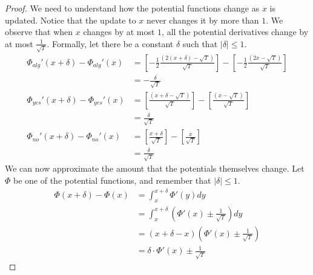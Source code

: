 \documentclass[final,12pt]{colt2018}
\newcommand{\Potential}{\Phi}
\newcommand{\PotentialAlg}{\Potential_{alg}}
\newcommand{\PotentialYes}{\Potential_{yes}}
\newcommand{\PotentialNo}{\Potential_{no}}
\begin{document}
\begin{proof}
  We need to understand how the potential functions change as $x$ is updated.
  Notice that the update to $x$ never changes it by more than $1$. We observe
  that when $x$ changes by at most $1$, all the potential derivatives change by
  at most $\frac{1}{\sqrt{T}}$. Formally, let there be a constant $\delta$ such
  that $|\delta| \le 1$.
  \begin{align*}
    \PotentialAlg'(x + \delta) - \PotentialAlg'(x)
      &= \left[ -\frac12 \frac{(2(x + \delta) - \sqrt{T})}{\sqrt{T}} \right]
      - \left[ -\frac12 \frac{(2x - \sqrt{T})}{\sqrt{T}} \right] \\
      &= -\frac{\delta}{\sqrt{T}} \\
    \PotentialYes'(x + \delta) - \PotentialYes'(x)
      &= \left[ \frac{(x + \delta - \sqrt{T})}{\sqrt{T}} \right]
      - \left[ \frac{(x - \sqrt{T})}{\sqrt{T}} \right] \\
      &= \frac{\delta}{\sqrt{T}} \\
    \PotentialNo'(x + \delta) - \PotentialNo'(x)
      &= \left[ \frac{x + \delta}{\sqrt{T}} \right]
      - \left[ \frac{x}{\sqrt{T}} \right] \\
      &= \frac{\delta}{\sqrt{T}}
  \end{align*}
  We can now approximate the amount that the potentials themselves change. Let
  $\Potential$ be one of the potential functions, and remember that
  $|\delta| \le 1$.
  \begin{align*}
    \Potential(x + \delta) - \Potential(x)
      &= \int_x^{x + \delta} \Potential'(y) dy \\
      &= \int_x^{x + \delta} \left( \Potential'(x) \pm \frac{1}{\sqrt{T}} \right) dy \\
      &= (x + \delta - x) \left( \Potential'(x) \pm \frac{1}{\sqrt{T}} \right) \\
      &= \delta \cdot \Potential'(x) \pm \frac{1}{\sqrt{T}}
  \end{align*}
  

\end{proof}
\end{document}
